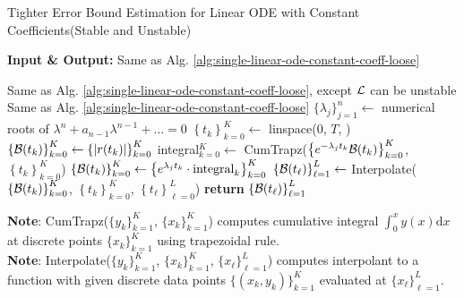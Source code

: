     \makeatletter
    \setlength{\@fptop}{0pt}
    \begin{algorithm}
        \caption{Tighter Error Bound Estimation for Linear ODE with Constant Coefficients\quad  (Stable and Unstable)}\label{alg:single-linear-ode-constant-coeff-tight}
        \textbf{Input \& Output:} Same as Alg. \ref{alg:single-linear-ode-constant-coeff-loose}
        \begin{algorithmic}
            \Require Same as Alg. \ref{alg:single-linear-ode-constant-coeff-loose}, except $\mathcal{L}$ can be unstable
            \Ensure Same as Alg. \ref{alg:single-linear-ode-constant-coeff-loose}
            \State $\{\lambda_j\}_{j=1}^{n} \gets$ numerical roots of $\lambda^n+a_{n-1}\lambda^{n-1}+\dots=0$
            \State $\left\{t_k\right\}_{k=0}^{K} \gets$ linspace($0$, $T$, )
            \State $\left\{\mathcal{B}(t_k)\right\}_{k=0}^{K} \gets \left\{|r(t_k)|\right\}_{k=0}^{K}$
                \State integral$_{k=0}^{K} \gets$ CumTrapz($\left\{e^{-\lambda_j t_{k}} \mathcal{B}(t_k)\right\}_{k=0}^{K}$, $\left\{t_k\right\}_{k=0}^{K}$) 
                \State $\left\{\mathcal{B}(t_k)\right\}_{k=0}^{K} \gets \left\{e^{\lambda_j t_{k}}\cdot \text{integral}_k \right\}_{k=0}^{K}$ 
            \EndFor
            \State $\left\{\mathcal{B}(t_\ell)\right\}_{\ell=1}^{L} \gets $ Interpolate($\left\{\mathcal{B}(t_k)\right\}_{k=0}^{K}$, $\left\{t_k\right\}_{k=0}^{K}$, $\left\{t_\ell\right\}_{\ell=0}^{L}$) 
            \State \textbf{return} $\left\{\mathcal{B}(t_\ell)\right\}_{\ell=1}^{L}$ 
        \end{algorithmic}

        \vspace{0.5em} 
        \textbf{Note}: CumTrapz($\{y_k\}_{k=1}^K$, $\{x_k\}_{k=1}^K$) computes cumulative integral $\int_{0}^x y(x)\mathrm{d}x$ at discrete points $\{x_k\}_{k=1}^K$ using trapezoidal rule.\\
        \textbf{Note}: Interpolate($\{y_k\}_{k=1}^K$, $\{x_k\}_{k=1}^K$, $\{x_\ell\}_{\ell=1}^L$) computes interpolant to a function with given discrete data points $\{(x_k, y_k)\}_{k=1}^K$ evaluated at $\{x_\ell\}_{\ell=1}^L$.
    \end{algorithm}
    \makeatother

